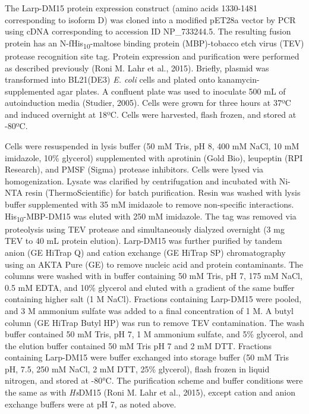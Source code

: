\documentclass[12pt,oneside]{reedthesis}
\begin{document}
The Larp-DM15 protein expression construct (amino acids 1330-1481 corresponding to isoform D) was cloned into a modified pET28a vector by PCR using cDNA corresponding to accession ID NP\_733244.5. The resulting fusion protein has an N-fHis\textsubscript{10}-maltose binding protein (MBP)-tobacco etch virus (TEV) protease recognition site tag. Protein expression and purification were performed as described previously (Roni M. Lahr et al., 2015). Briefly, plasmid was transformed into BL21(DE3) \emph{E. coli} cells and plated onto kanamycin-supplemented agar plates. A confluent plate was used to inoculate 500 mL of autoinduction media (Studier, 2005). Cells were grown for three hours at 37ºC and induced overnight at 18ºC. Cells were harvested, flash frozen, and stored at -80ºC.

Cells were resuspended in lysis buffer (50 mM Tris, pH 8, 400 mM NaCl, 10 mM imidazole, 10\% glycerol) supplemented with aprotinin (Gold Bio), leupeptin (RPI Research), and PMSF (Sigma) protease inhibitors. Cells were lysed via homogenization. Lysate was clarified by centrifugation and incubated with Ni-NTA resin (ThermoScientific) for batch purification. Resin was washed with lysis buffer supplemented with 35 mM imidazole to remove non-specific interactions. His\textsubscript{10}-MBP-DM15 was eluted with 250 mM imidazole. The tag was removed via proteolysis using TEV protease and simultaneously dialyzed overnight (3 mg TEV to 40 mL protein elution). Larp-DM15 was further purified by tandem anion (GE HiTrap Q) and cation exchange (GE HiTrap SP) chromatography using an AKTA Pure (GE) to remove nucleic acid and protein contaminants. The columns were washed with in buffer containing 50 mM Tris, pH 7, 175 mM NaCl, 0.5 mM EDTA, and 10\% glycerol and eluted with a gradient of the same buffer containing higher salt (1 M NaCl). Fractions containing Larp-DM15 were pooled, and 3 M ammonium sulfate was added to a final concentration of 1 M. A butyl column (GE HiTrap Butyl HP) was run to remove TEV contamination. The wash buffer contained 50 mM Tris, pH 7, 1 M ammonium sulfate, and 5\% glycerol, and the elution buffer contained 50 mM Tris pH 7 and 2 mM DTT. Fractions containing Larp-DM15 were buffer exchanged into storage buffer (50 mM Tris pH, 7.5, 250 mM NaCl, 2 mM DTT, 25\% glycerol), flash frozen in liquid nitrogen, and stored at -80°C. The purification scheme and buffer conditions were the same as with \emph{Hs}DM15 (Roni M. Lahr et al., 2015), except cation and anion exchange buffers were at pH 7, as noted above.
\end{document}
